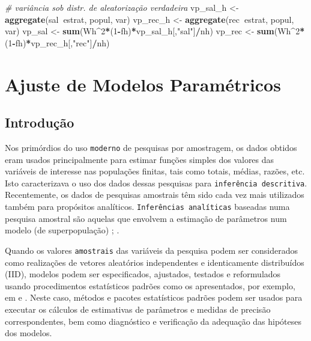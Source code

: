 \documentclass[]{book}
\newenvironment{Shaded}{\begin{snugshade}}{\end{snugshade}}
\newcommand{\KeywordTok}[1]{\textcolor[rgb]{0.13,0.29,0.53}{\textbf{#1}}}
\newcommand{\DecValTok}[1]{\textcolor[rgb]{0.00,0.00,0.81}{#1}}
\newcommand{\StringTok}[1]{\textcolor[rgb]{0.31,0.60,0.02}{#1}}
\newcommand{\CommentTok}[1]{\textcolor[rgb]{0.56,0.35,0.01}{\textit{#1}}}
\newcommand{\OperatorTok}[1]{\textcolor[rgb]{0.81,0.36,0.00}{\textbf{#1}}}
\newcommand{\NormalTok}[1]{#1}
\theoremstyle{definition}
\theoremstyle{definition}
\theoremstyle{definition}
\theoremstyle{remark}
\begin{document}
\begin{Shaded}
\begin{Highlighting}[]
\CommentTok{# variância sob distr. de aleatorização verdadeira}
\NormalTok{vp_sal_h <-}\StringTok{ }\KeywordTok{aggregate}\NormalTok{(sal}\OperatorTok{~}\NormalTok{estrat, popul, var)}
\NormalTok{vp_rec_h <-}\StringTok{ }\KeywordTok{aggregate}\NormalTok{(rec}\OperatorTok{~}\NormalTok{estrat, popul, var)}
\NormalTok{vp_sal <-}\StringTok{ }\KeywordTok{sum}\NormalTok{(Wh}\OperatorTok{^}\DecValTok{2}\OperatorTok{*}\NormalTok{(}\DecValTok{1}\OperatorTok{-}\NormalTok{fh)}\OperatorTok{*}\NormalTok{vp_sal_h[,}\StringTok{"sal"}\NormalTok{]}\OperatorTok{/}\NormalTok{nh)}
\NormalTok{vp_rec <-}\StringTok{ }\KeywordTok{sum}\NormalTok{(Wh}\OperatorTok{^}\DecValTok{2}\OperatorTok{*}\NormalTok{(}\DecValTok{1}\OperatorTok{-}\NormalTok{fh)}\OperatorTok{*}\NormalTok{vp_rec_h[,}\StringTok{"rec"}\NormalTok{]}\OperatorTok{/}\NormalTok{nh)}
\end{Highlighting}
\end{Shaded}

\chapter{Ajuste de Modelos Paramétricos}\label{ajmodpar}

\section{Introdução}\label{modpar1}

Nos primórdios do uso \texttt{moderno} de pesquisas por amostragem, os
dados obtidos eram usados principalmente para estimar funções simples
dos valores das variáveis de interesse nas populações finitas, tais como
totais, médias, razões, etc. Isto caracterizava o uso dos dados dessas
pesquisas para \texttt{inferência\ descritiva}. Recentemente, os dados
de pesquisas amostrais têm sido cada vez mais utilizados também para
propósitos analíticos. \texttt{Inferências\ analíticas} baseadas numa
pesquisa amostral são aquelas que envolvem a estimação de parâmetros num
modelo (de superpopulação) \citep{kalton83b}; \citep{binder87}.

Quando os valores \texttt{amostrais} das variáveis da pesquisa podem ser
considerados como realizações de vetores aleatórios independentes e
identicamente distribuídos (IID), modelos podem ser especificados,
ajustados, testados e reformulados usando procedimentos estatísticos
padrões como os apresentados, por exemplo, em \citep{bickel} e
\citep{garthwaite}. Neste caso, métodos e pacotes estatísticos padrões
podem ser usados para executar os cálculos de estimativas de parâmetros
e medidas de precisão correspondentes, bem como diagnóstico e
verificação da adequação das hipóteses dos modelos.
\end{document}
